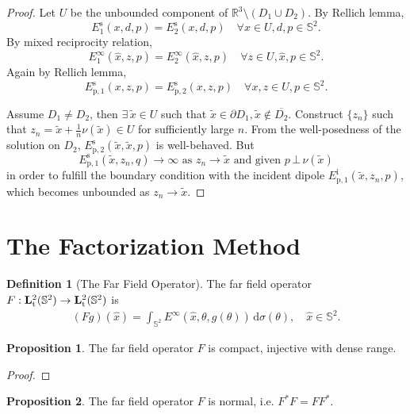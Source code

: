 \documentclass[a4paper,12pt]{article}
\theoremstyle{definition}
\newtheorem{dfn}{Definition}
\newtheorem{prp}{Proposition}
\newcommand\lTT{{\bf L}^2_\text{t}}
\newcommand\lTS{\lTT(\mathbb{S}^2)}
\newcommand\intc[2][(\theta)]{\int_{\mathbb{S}^2}#2\,\text{d}\sigma#1}
\begin{document}
\begin{proof}
  Let $U$ be the unbounded component of $\mathbb{R}^3\setminus(D_1\cup D_2)$. By Rellich lemma, 
  $$E_1^\text{s}(x, d, p)=E_2^\text{s}(x, d, p)\quad\forall x\in U, d, p\in\mathbb{S}^2.$$ 
  By mixed reciprocity relation,
  $$E_1^\infty(\hat{x}, z, p)=E_2^\infty(\hat{x}, z, p)\quad\forall z\in U, \hat{x}, p\in\mathbb{S}^2.$$ 
  Again by Rellich lemma,
  $$E_{\text{p},1}^\text{s}(x, z, p)=E_{\text{p},2}^\text{s}(x, z, p)\quad\forall x, z\in U, p\in\mathbb{S}^2.$$

  Assume $D_1\not=D_2$, then $\exists\,\widetilde{x}\in U$ such that $\widetilde{x}\in\partial D_1, \widetilde{x}\not\in\overline{D_2}$. Construct $\{z_n\}$ such that $z_n=\widetilde{x}+\frac{1}{n}\nu(\widetilde{x})\in U$ for sufficiently large $n$. From the well-posedness of the solution on $D_2$, $E_{\text{p},2}^\text{s}(\widetilde{x}, \widetilde{x}, p)$ is well-behaved. But $$E_{\text{p},1}^\text{s}(\widetilde{x}, z_n, q)\to\infty\text{ as } z_n\to\widetilde{x}\text{ and given } p\,\bot\,\nu(\widetilde{x})$$ in order to fulfill the boundary condition with the incident dipole $E_{\text{p},1}^\text{i}(\widetilde{x}, z_n, p)$, which becomes unbounded as $z_n\to\widetilde{x}$.
\end{proof}

\section{The Factorization Method}

\begin{dfn}[The Far Field Operator]
  The far field operator $F:\lTS\rightarrow\lTS$ is  
  \begin{align}
    \left(Fg\right)\left(\hat{x}\right)=\intc{E^\infty(\hat{x}, \theta, g(\theta))},\quad\hat{x}\in\mathbb{S}^2.
  \end{align}
\end{dfn}

\begin{prp}
  The far field operator $F$ is compact, injective with dense range.
\end{prp}

\begin{proof}

\end{proof}

\begin{prp}
  The far field operator $F$ is normal, i.e. $F^*F=FF^*$.
\end{prp}
\end{document}
